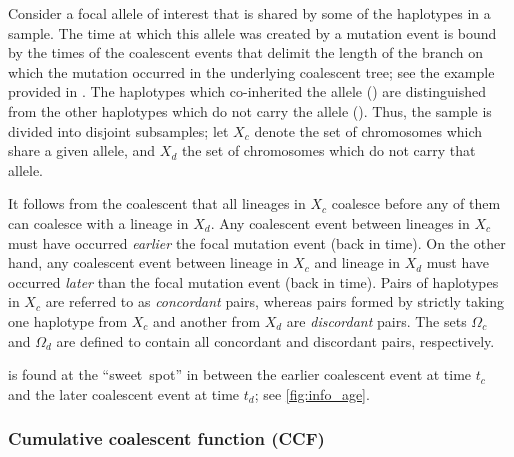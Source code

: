 Consider a focal allele of interest that is shared by some of the haplotypes in a sample.
The time at which this allele was created by a mutation event is bound by the times of the  coalescent events that delimit the length of the branch on which the mutation occurred in the underlying coalescent tree; see the example provided in .
The haplotypes which co-inherited the allele () are distinguished from the other haplotypes which do not carry the allele ().
Thus, the sample is divided into  disjoint subsamples; let $X_c$ denote the set of chromosomes which share a given allele, and $X_d$ the set of chromosomes which do not carry that allele.

%

%

It follows from the coalescent that all lineages in $X_c$ coalesce before any of them can coalesce with a lineage in $X_d$.
Any coalescent event between  lineages in $X_c$ must have occurred \emph{earlier}  the focal mutation event (back in time).
On the other hand, any coalescent event between  lineage in $X_c$ and  lineage in $X_d$ must have occurred \emph{later} than the focal mutation event (back in time).
Pairs of haplotypes in $X_c$ are referred to as \emph{concordant} pairs, whereas pairs formed by strictly taking one haplotype from $X_c$ and another from $X_d$ are \emph{discordant} pairs.
The sets $\Omega_c$ and $\Omega_d$ are defined to contain all concordant and discordant pairs, respectively.

 is found at the ``sweet~spot'' in between the earlier coalescent event at time $t_c$ and the later coalescent event at time $t_d$; see \cref{fig:info_age}.



%
\subsubsection{Cumulative coalescent function (CCF)}\label{sec:ccf_desc}
%

